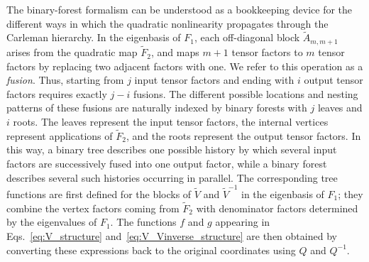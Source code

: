 \documentclass[superscriptaddress,onecolumn,nofootinbib,longbibliography,a4paper,accepted=2026-09-29]{quantumarticle}
\theoremstyle{plain}
\theoremstyle{definition}
\numberwithin{thm}{section}
\numberwithin{assumption}{section}
\numberwithin{lemma}{section}
\numberwithin{prop}{section}
\numberwithin{cor}{section}
\numberwithin{definition}{section}
\numberwithin{rmk}{section}
\numberwithin{equation}{section}
\begin{document}
The binary-forest formalism can be understood as a bookkeeping device for the different ways in which the quadratic nonlinearity propagates through the Carleman hierarchy. In the eigenbasis of $F_1$, each off-diagonal block $\tilde A_{m,m+1}$ arises from the quadratic map $\tilde F_2$, and maps $m+1$ tensor factors to $m$ tensor factors by replacing two adjacent factors with one. We refer to this operation as a \emph{fusion}. Thus, starting from $j$ input tensor factors and ending with $i$ output tensor factors requires exactly $j-i$ fusions. The different possible locations and nesting patterns of these fusions are naturally indexed by binary forests with $j$ leaves and $i$ roots. The leaves represent the input tensor factors, the internal vertices represent applications of $\tilde F_2$, and the roots represent the output tensor factors. In this way, a binary tree describes one possible history by which several input factors are successively fused into one output factor, while a binary forest describes several such histories occurring in parallel. The corresponding tree functions are first defined for the blocks of $\tilde V$ and $\tilde V^{-1}$ in the eigenbasis of $F_1$; they combine the vertex factors coming from $\tilde F_2$ with denominator factors determined by the eigenvalues of $F_1$. The functions $f$ and $g$ appearing in Eqs.~\eqref{eq:V_structure} and~\eqref{eq:V_Vinverse_structure} are then obtained by converting these expressions back to the original coordinates using $Q$ and $Q^{-1}$. 
\end{document}
